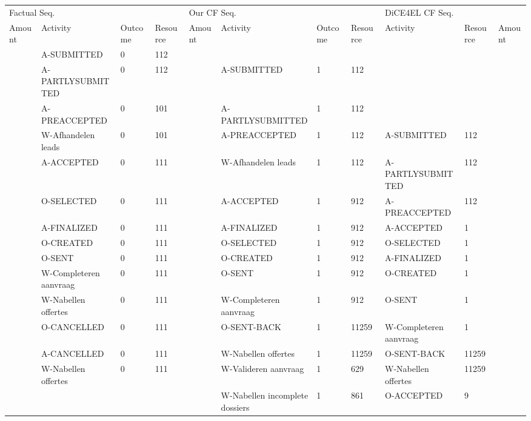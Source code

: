 \begin{tabular}{lllllllllll}
\toprule
\multicolumn{4}{l}{Factual Seq.} & \multicolumn{4}{l}{Our CF Seq.} & \multicolumn{3}{l}{DiCE4EL CF Seq.} \\
Amount & Activity & Outcome & Resource & Amount & Activity & Outcome & Resource & Activity & Resource & Amount \\
\midrule
 & A-SUBMITTED & 0 & 112 &  &  &  &  &  &  &  \\
 & A-PARTLYSUBMITTED & 0 & 112 &  & A-SUBMITTED & 1 & 112 &  &  &  \\
 & A-PREACCEPTED & 0 & 101 &  & A-PARTLYSUBMITTED & 1 & 112 &  &  &  \\
 & W-Afhandelen leads & 0 & 101 &  & A-PREACCEPTED & 1 & 112 & A-SUBMITTED & 112 &  \\
 & A-ACCEPTED & 0 & 111 &  & W-Afhandelen leads & 1 & 112 & A-PARTLYSUBMITTED & 112 &  \\
 & O-SELECTED & 0 & 111 &  & A-ACCEPTED & 1 & 912 & A-PREACCEPTED & 112 &  \\
 & A-FINALIZED & 0 & 111 &  & A-FINALIZED & 1 & 912 & A-ACCEPTED & 1 &  \\
 & O-CREATED & 0 & 111 &  & O-SELECTED & 1 & 912 & O-SELECTED & 1 &  \\
 & O-SENT & 0 & 111 &  & O-CREATED & 1 & 912 & A-FINALIZED & 1 &  \\
 & W-Completeren aanvraag & 0 & 111 &  & O-SENT & 1 & 912 & O-CREATED & 1 &  \\
 & W-Nabellen offertes & 0 & 111 &  & W-Completeren aanvraag & 1 & 912 & O-SENT & 1 &  \\
 & O-CANCELLED & 0 & 111 &  & O-SENT-BACK & 1 & 11259 & W-Completeren aanvraag & 1 &  \\
 & A-CANCELLED & 0 & 111 &  & W-Nabellen offertes & 1 & 11259 & O-SENT-BACK & 11259 &  \\
 & W-Nabellen offertes & 0 & 111 &  & W-Valideren aanvraag & 1 & 629 & W-Nabellen offertes & 11259 &  \\
 &  &  &  &  & W-Nabellen incomplete dossiers & 1 & 861 & O-ACCEPTED & 9 &  \\
\bottomrule
\end{tabular}
